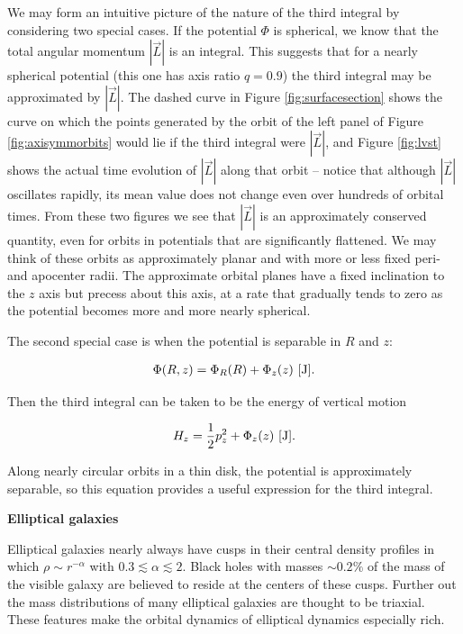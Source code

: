 \documentclass[a4paper,10pt]{article}
\begin{document}
{\noindent}We may form an intuitive picture of the nature of the third integral by considering two special cases. If the potential $\Phi$ is spherical, we know that the total angular momentum $|\vec{L}|$ is an integral. This suggests that for a nearly spherical potential (this one has axis ratio $q=0.9$) the third integral may be approximated by $|\vec{L}|$. The dashed curve in Figure \ref{fig:surfacesection} shows the curve on which the points generated by the orbit of the left panel of Figure \ref{fig:axisymmorbits} would lie if the third integral were $|\vec{L}|$, and Figure \ref{fig:lvst} shows the actual time evolution of $|\vec{L}|$ along that orbit -- notice that although $|\vec{L}|$ oscillates rapidly, its mean value does not change even over hundreds of orbital times. From these two figures we see that $|\vec{L}|$ is an approximately conserved quantity, even for orbits in potentials that are significantly flattened. We may think of these orbits as approximately planar and with more or less fixed peri- and apocenter radii. The approximate orbital planes have a fixed inclination to the $z$ axis but precess about this axis, at a rate that gradually tends to zero as the potential becomes more and more nearly spherical.

{\noindent}The second special case is when the potential is separable in $R$ and $z$:

\begin{align*}
    \Phi(R,z)=\Phi_R(R)+\Phi_z(z) ~ [{\rm J}].
\end{align*}

{\noindent}Then the third integral can be taken to be the energy of vertical motion

\begin{align*}
    H_z = \frac{1}{2}p_z^2 + \Phi_z(z) ~ [{\rm J}].
\end{align*}

{\noindent}Along nearly circular orbits in a thin disk, the potential is approximately separable, so this equation provides a useful expression for the third integral.

{\noindent}\textbf{Elliptical galaxies}

{\noindent}Elliptical galaxies nearly always have cusps in their central density profiles in which $\rho\sim r^{-\alpha}$ with $0.3\lesssim\alpha\lesssim2$. Black holes with masses $\sim0.2\%$ of the mass of the visible galaxy are believed to reside at the centers of these cusps. Further out the mass distributions of many elliptical galaxies are thought to be triaxial. These features make the orbital dynamics of elliptical dynamics especially rich.
\end{document}
